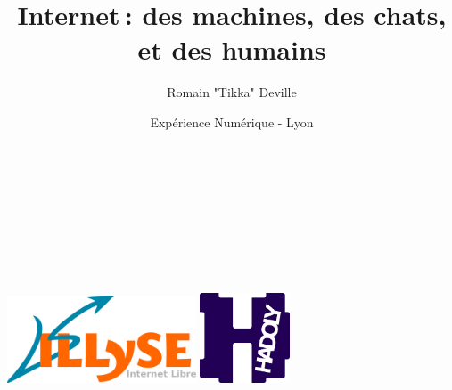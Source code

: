 \documentclass{beamer}
\title{Internet : des machines, des chats, et des humains}
\author{Romain "Tikka" Deville}
\date{Expérience Numérique - Lyon}
\begin{document}
  \setcounter{framenumber}{0}
  \begin{frame}{~}
    \centering
    \vspace{0.5em}
    \begin{alertblock}{}
      \vspace{0.5em}
      \centering
      \Large \inserttitle
      \\\footnotesize ~
    \end{alertblock}
    \vspace{1em}
    \insertauthor
    \\\vspace{2em}
    \insertdate
    \\\vspace{2em}
    \includegraphics[width=0.42\textwidth]{theme/illyse.png}
    \hfill
    \includegraphics[width=0.2\textwidth]{theme/hadoly.png}
  \end{frame}
  
  
  
  \setcounter{framenumber}{42}
\end{document}
